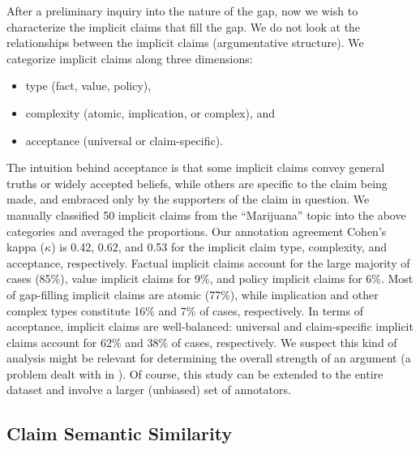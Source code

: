 After a preliminary inquiry into the nature of the gap, 
now we wish to characterize the implicit claims that fill the gap. 
We do not look at the relationships between the implicit claims (argumentative
structure). 
We categorize implicit claims along three dimensions: 
\begin{itemize}
\item type (fact, value, policy), 
\item complexity (atomic, implication, or complex), and
\item acceptance (universal or claim-specific).
\end{itemize}
The intuition behind acceptance is that some implicit claims convey general truths or widely
accepted beliefs, while others are specific to the claim being made, and embraced
only by the supporters of the claim in question. 
We manually classified 50 implicit claims from the ``Marijuana'' topic into the
above categories and averaged the proportions. 
Our annotation agreement Cohen's kappa ($\kappa$) \citep{cohen1960coefficient} is 0.42, 
0.62, and 0.53 for the implicit claim type, complexity, and acceptance, respectively.
Factual implicit claims account for the large majority of cases (85\%), value implicit claims
for 9\%, and policy implicit claims for 6\%.
Most of gap-filling implicit claims are atomic (77\%), while implication and other complex
types constitute 16\% and 7\% of cases, respectively.
In terms of acceptance, implicit claims are well-balanced: universal and claim-specific 
implicit claims account for 62\% and 38\% of cases, respectively. 
We suspect this kind of analysis might be relevant for determining the overall 
strength of an argument (a problem dealt with in \citep{park2014identifying}). 
Of course, this study can be extended to the entire dataset and involve
a larger (unbiased) set of annotators. 

\subsection{Claim Semantic Similarity}

